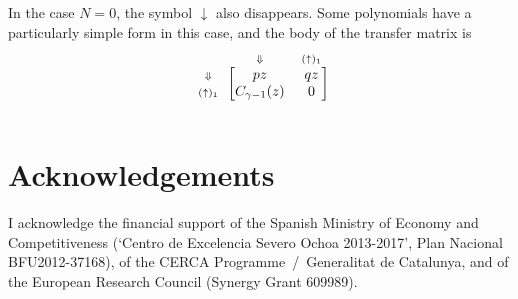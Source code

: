 \documentclass{article}
\newcommand{\DN}{\scriptstyle{\Downarrow}}
\newcommand{\up}[1]{\scriptstyle{(\uparrow)_{#1}}}
\begin{document}
In the case $N = 0$, the symbol $\downarrow$ also disappears. Some
polynomials have a particularly simple form in this case, and the
body of the transfer matrix is
\begin{equation*}
\begin{blockarray}{ccc}
   & \DN & \up{1} \\
\begin{block}{c[cc]}
\DN    & pz              & qz \\
\up{1} & C_{\gamma-1}(z) & 0  \\
\end{block}
\end{blockarray}
\end{equation*}


\section*{Acknowledgements}

I acknowledge the financial support of the Spanish Ministry of Economy and
Competitiveness (‘Centro de Excelencia Severo Ochoa 2013-2017’, Plan
Nacional BFU2012-37168), of the CERCA Programme~/~Generalitat de
Catalunya, and of the European Research Council (Synergy Grant 609989).






\end{document}
